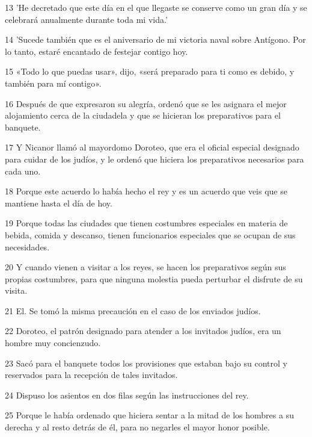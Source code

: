\par 13 'He decretado que este día en el que llegaste se conserve como un gran día y se celebrará anualmente durante toda mi vida.'

\par 14 'Sucede también que es el aniversario de mi victoria naval sobre Antígono. Por lo tanto, estaré encantado de festejar contigo hoy.

\par 15 «Todo lo que puedas usar», dijo, «será preparado para ti como es debido, y también para mí contigo».

\par 16 Después de que expresaron su alegría, ordenó que se les asignara el mejor alojamiento cerca de la ciudadela y que se hicieran los preparativos para el banquete.

\par 17 Y Nicanor llamó al mayordomo Doroteo, que era el oficial especial designado para cuidar de los judíos, y le ordenó que hiciera los preparativos necesarios para cada uno.

\par 18 Porque este acuerdo lo había hecho el rey y es un acuerdo que veis que se mantiene hasta el día de hoy.

\par 19 Porque todas las ciudades que tienen costumbres especiales en materia de bebida, comida y descanso, tienen funcionarios especiales que se ocupan de sus necesidades.

\par 20 Y cuando vienen a visitar a los reyes, se hacen los preparativos según sus propias costumbres, para que ninguna molestia pueda perturbar el disfrute de su visita.

\par 21 El. Se tomó la misma precaución en el caso de los enviados judíos.

\par 22 Doroteo, el patrón designado para atender a los invitados judíos, era un hombre muy concienzudo.

\par 23 Sacó para el banquete todos los provisiones que estaban bajo su control y reservados para la recepción de tales invitados.

\par 24 Dispuso los asientos en dos filas según las instrucciones del rey.

\par 25 Porque le había ordenado que hiciera sentar a la mitad de los hombres a su derecha y al resto detrás de él, para no negarles el mayor honor posible.

